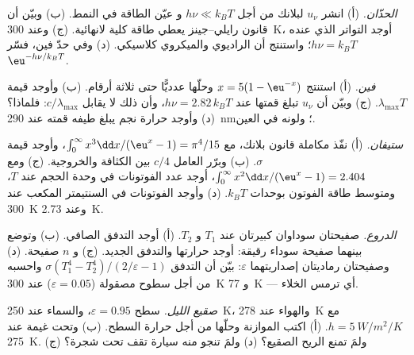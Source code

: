 \begin{exercise}[$\star\star$]\label{exo:b2:thermal-radiation:5}
\emph{الحدّان.} (أ) انشر $u_\nu$ لبلانك من أجل $h\nu \ll k_BT$ و
عيّن الطاقة في النمط. (ب) وبيّن أن قانون رايلي--جينز
يعطي طاقة كلية لانهائية. (ج) وعند \qty{300}{K}، أوجد التواتر الذي عنده
$h\nu = k_BT$؛ واستنتج أن  الراديوي والميكروي
كلاسيكي. (د) وفي حدّ فين، فسّر $\eu^{-h\nu/k_BT}$.
\end{exercise}

\begin{exercise}[$\star\star$]\label{exo:b2:thermal-radiation:6}
\emph{فين.} (أ) استنتج $x = 5(1 - \eu^{-x})$ وحلّها عدديًّا
حتى ثلاثة أرقام. (ب) وأوجد قيمة $\lambda_{\max}T$. (ج) وبيّن أن $u_\nu$
تبلغ قمتها عند $h\nu = 2.82\,k_BT$، وأن ذلك لا يقابل
$c/\lambda_{\max}$: فلماذا؟ (د) وأوجد حرارة نجم يبلغ طيفه
قمته عند \qty{290}{nm}؛ ولونه في العين.
\end{exercise}

\begin{exercise}[$\star\star$]\label{exo:b2:thermal-radiation:7}
\emph{ستيفان.} (أ) نفّذ مكاملة قانون بلانك، مع
$\int_0^\infty x^3\dd x/(\eu^x - 1) = \pi^4/15$، وأوجد قيمة $\sigma$.
(ب) وبرّر العامل $c/4$ بين الكثافة والخروجية. (ج)
ومع $\int_0^\infty x^2\dd x/(\eu^x - 1) = 2.404$، أوجد عدد الفوتونات
في وحدة الحجم عند $T$، ومتوسط طاقة الفوتون بوحدات $k_BT$.
(د) وأوجد الفوتونات في السنتيمتر المكعب عند \qty{300}{K} وعند \qty{2.73}{K}.
\end{exercise}

\begin{exercise}[$\star\star$]\label{exo:b2:thermal-radiation:8}
\emph{الدروع.} صفيحتان سوداوان كبيرتان عند $T_1$ و $T_2$. (أ) أوجد التدفق الصافي.
(ب) وتوضع بينهما صفيحة سوداء رقيقة: أوجد حرارتها والتدفق
الجديد. (ج) و $n$ صفيحة. (د) وصفيحتان رماديتان إصداريتهما $\varepsilon$:
بيّن أن التدفق $\sigma(T_1^4 - T_2^4)/(2/\varepsilon - 1)$ واحسبه
من أجل سطوح مصقولة ($\varepsilon = 0.05$) عند \qty{300}{K} و
\qty{77}{K} --- أي ترمس الخلاء.
\end{exercise}

\begin{exercise}[$\star\star$]\label{exo:b2:thermal-radiation:9}
\emph{صقيع الليل.} سطح $\varepsilon = 0.95$، والسماء عند \qty{250}{K}، والهواء عند
\qty{278}{K} مع $h = \qty{5}{W/m^2/K}$. (أ) اكتب الموازنة وحلّها
من أجل حرارة السطح. (ب) وتحت غيمة عند \qty{275}{K}. (ج) ولمَ
تمنع الريح الصقيع؟ (د) ولمَ تنجو منه سيارة تقف تحت شجرة؟
\end{exercise}

